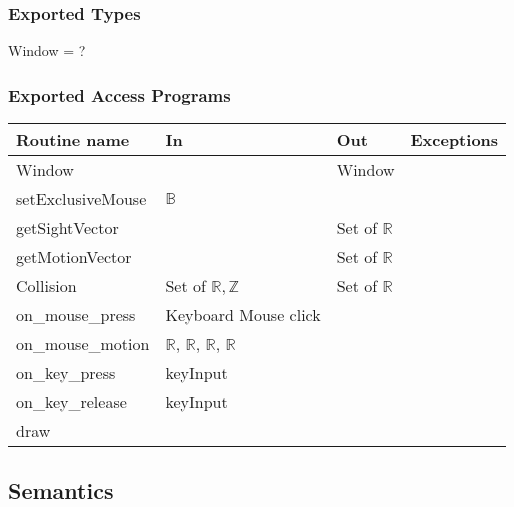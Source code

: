 \documentclass[12pt]{article}
\begin{document}
\subsubsection* {Exported Types}

Window = ?

\subsubsection* {Exported Access Programs}

\begin{tabular}{| l | l | l | l |}
\hline
\textbf{Routine name} & \textbf{In} & \textbf{Out} & \textbf{Exceptions}\\
\hline
Window & ~ & Window & \\
\hline
setExclusiveMouse & $\mathbb{B}$ & ~ & ~\\
\hline
getSightVector & ~ & Set of $\mathbb{R}$ & ~\\
\hline
getMotionVector & ~ & Set of $\mathbb{R}$ & ~\\
\hline
Collision & Set of $\mathbb{R}, \mathbb{Z}$ & Set of $\mathbb{R}$ & ~\\
\hline
on\_mouse\_press & Keyboard Mouse click & ~ & ~\\
\hline
on\_mouse\_motion & $\mathbb{R}$, $\mathbb{R}$, $\mathbb{R}$, $\mathbb{R}$ & ~ & ~\\
\hline
on\_key\_press & keyInput & ~ & ~\\
\hline
on\_key\_release & keyInput & ~ & ~\\
\hline
draw & ~ & ~ & ~\\
\hline
\end{tabular}

\subsection* {Semantics}
\end{document}
